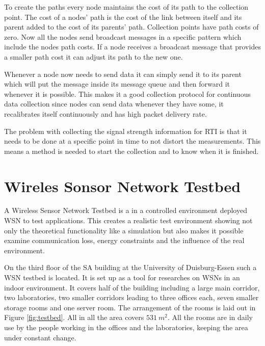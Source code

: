 To create the paths every node maintains the cost of its path to the collection point. The cost of a nodes' path is the cost of the link between itself and its parent added to the cost of its parents' path. Collection points have path costs of zero. Now all the nodes send broadcast messages in a specific pattern which include the nodes path costs. If a node receives a broadcast message that provides a smaller path cost it can adjust its path to the new one.

Whenever a node now needs to send data it can simply send it to its parent which will put the message inside its message queue and then forward it whenever it is possible. This makes it a good collection protocol for continuous data collection since nodes can send data whenever they have some, it recalibrates itself continuously and has high packet delivery rate. \cite{CTP}

The problem with collecting the signal strength information for RTI is that it needs to be done at a specific point in time to not distort the measurements. This means a method is needed to start the collection and to know when it is finished. 
\section{Wireles Sonsor Network Testbed}
\label{chp:mat_testbed}
A Wireless Sensor Network Testbed is a in a controlled environment deployed WSN to test applications. This creates a realistic test environment showing not only the theoretical functionality like a simulation but also makes it possible examine communication loss, energy constraints and the influence of the real environment.  

On the third floor of the SA building at the University of Duisburg-Essen such a WSN testbed is located. It is set up as a tool for researches on WSNs in an indoor environment. It covers half of the building including a large main corridor, two laboratories, two smaller corridors leading to three offices each, seven smaller storage rooms and one server room. The arrangement of the rooms is laid out in Figure \ref{fig:testbed}. All in all the area covers $531\ m^2$. All the rooms are in daily use by the people working in the offices and the laboratories, keeping the area under constant change.

